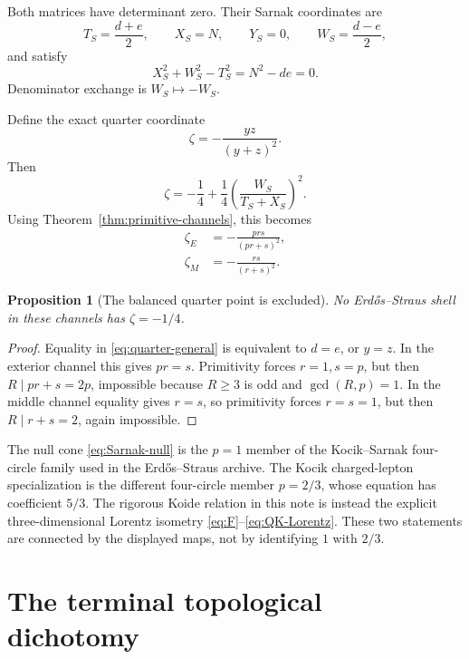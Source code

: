 \documentclass[11pt]{article}
\newtheorem{proposition}[theorem]{Proposition}
\theoremstyle{definition}
\theoremstyle{remark}
\begin{document}
Both matrices have determinant zero.  Their Sarnak coordinates are
\begin{equation}\label{eq:Sarnak}
 T_S=\frac{d+e}{2},
 \qquad X_S=N,
 \qquad Y_S=0,
 \qquad W_S=\frac{d-e}{2},
\end{equation}
and satisfy
\begin{equation}\label{eq:Sarnak-null}
 X_S^2+W_S^2-T_S^2=N^2-de=0.
\end{equation}
Denominator exchange is $W_S\mapsto-W_S$.

Define the exact quarter coordinate
\begin{equation}\label{eq:zeta}
 \zeta=-\frac{yz}{(y+z)^2}.
\end{equation}
Then
\begin{equation}\label{eq:quarter-general}
 \zeta=-\frac14+\frac14
 \left(\frac{W_S}{T_S+X_S}\right)^2.
\end{equation}
Using Theorem~\ref{thm:primitive-channels}, this becomes
\begin{align}
 \zeta_E&=-\frac{prs}{(pr+s)^2},\label{eq:zetaE}\\
 \zeta_M&=-\frac{rs}{(r+s)^2}.\label{eq:zetaM}
\end{align}

\begin{proposition}[The balanced quarter point is excluded]
\label{prop:quarter-excluded}
No Erd\H{o}s--Straus shell in these channels has $\zeta=-1/4$.
\end{proposition}

\begin{proof}
Equality in \eqref{eq:quarter-general} is equivalent to $d=e$, or $y=z$.
In the exterior channel this gives $pr=s$.  Primitivity forces $r=1,s=p$,
but then $R\mid pr+s=2p$, impossible because $R\ge3$ is odd and
$\gcd(R,p)=1$.  In the middle channel equality gives $r=s$, so primitivity
forces $r=s=1$, but then $R\mid r+s=2$, again impossible.
\end{proof}

The null cone \eqref{eq:Sarnak-null} is the $p=1$ member of the
Kocik--Sarnak four-circle family used in the Erd\H{o}s--Straus archive.  The
Kocik charged-lepton specialization is the different four-circle member
$p=2/3$, whose equation has coefficient $5/3$.  The rigorous Koide relation in
this note is instead the explicit three-dimensional Lorentz isometry
\eqref{eq:F}--\eqref{eq:QK-Lorentz}.  These two statements are connected by
the displayed maps, not by identifying $1$ with $2/3$.

\section{The terminal topological dichotomy}
\end{document}
